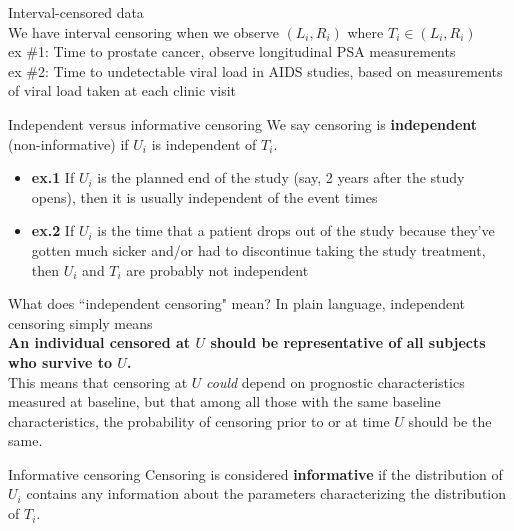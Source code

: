 \documentclass[envcountsect, 10pt, portrait, palatino]{beamer}
\begin{document}
\begin{frame}{Interval-censored data}
\\[3ex]
We have interval censoring when we observe $(L_i,R_i)$ where  $T_i\in (L_i,R_i)$
\\[2ex]
ex \#1: Time to prostate cancer, observe longitudinal PSA measurements
\\[2ex]
ex \#2: Time to undetectable viral load in AIDS studies, based on
measurements of viral load taken at each clinic visit
\end{frame}
\begin{frame}{Independent versus informative censoring}
We say censoring is {\bf independent} (non-informative)
if $U_i$ is independent of $T_i$.\\
\begin{itemize}
\item {\bf ex.1} If $U_i$ is the planned end of the study (say, 2
years after the study opens), then it is usually independent of the
event times
~\\
\item {\bf ex.2} If $U_i$ is the time that a patient drops out of the study
because they've gotten much sicker and/or had to discontinue taking
the study treatment, then $U_i$ and $T_i$ are probably not independent
\end{itemize}
\end{frame}
\begin{frame}{What does ``independent censoring" mean?}
In plain language, independent censoring simply means\\[2ex]
{\bf An individual censored at $U$ should be representative of all subjects
who survive to $U$.}
~\\[2ex]
This means that censoring at $U$ {\em could} depend
on prognostic characteristics measured at baseline, but that among
all those with the same baseline characteristics, the probability
of censoring prior to or at time $U$ should be the same.
\end{frame}
\begin{frame}{Informative censoring}
Censoring is considered {\bf informative} if the
distribution of $U_i$ contains any information about the parameters
characterizing the distribution of $T_i$.
\end{frame}
\end{document}
